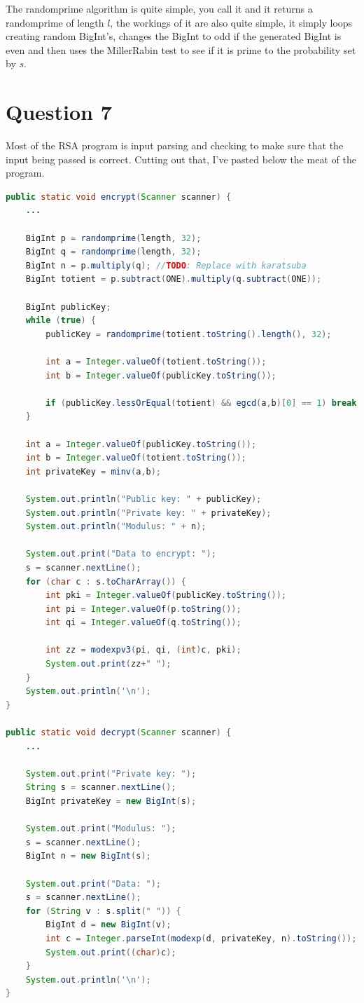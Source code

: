 \documentclass[journal,a4paper]{article}
\begin{document}
The randomprime algorithm is quite simple, you call it and it returns a randomprime of length $l$, the workings of it are also quite simple, it simply loops creating random BigInt's, changes the BigInt to odd if the generated BigInt is even and then uses the MillerRabin test to see if it is prime to the probability set by $s$.

\section*{Question 7}
Most of the RSA program is input parsing and checking to make sure that the input being passed is correct. Cutting out that, I've pasted below the meat of the program.
\begin{lstlisting}[language=Java]
public static void encrypt(Scanner scanner) {
	...
	
	BigInt p = randomprime(length, 32);
	BigInt q = randomprime(length, 32);
	BigInt n = p.multiply(q); //TODO: Replace with karatsuba
	BigInt totient = p.subtract(ONE).multiply(q.subtract(ONE));

	BigInt publicKey;
	while (true) {
		publicKey = randomprime(totient.toString().length(), 32);

		int a = Integer.valueOf(totient.toString());
		int b = Integer.valueOf(publicKey.toString());

		if (publicKey.lessOrEqual(totient) && egcd(a,b)[0] == 1) break;
	}

	int a = Integer.valueOf(publicKey.toString());
	int b = Integer.valueOf(totient.toString());
	int privateKey = minv(a,b);

	System.out.println("Public key: " + publicKey);
	System.out.println("Private key: " + privateKey);
	System.out.println("Modulus: " + n);

	System.out.print("Data to encrypt: ");
	s = scanner.nextLine();
	for (char c : s.toCharArray()) {
		int pki = Integer.valueOf(publicKey.toString());
		int pi = Integer.valueOf(p.toString());
		int qi = Integer.valueOf(q.toString());

		int zz = modexpv3(pi, qi, (int)c, pki);
		System.out.print(zz+" ");
	}
	System.out.println('\n');
}

public static void decrypt(Scanner scanner) {
	...
	
	System.out.print("Private key: ");
	String s = scanner.nextLine();
	BigInt privateKey = new BigInt(s);

	System.out.print("Modulus: ");
	s = scanner.nextLine();
	BigInt n = new BigInt(s);

	System.out.print("Data: ");
	s = scanner.nextLine();
	for (String v : s.split(" ")) {
		BigInt d = new BigInt(v);
		int c = Integer.parseInt(modexp(d, privateKey, n).toString());
		System.out.print((char)c);
	}
	System.out.println('\n');
}
\end{lstlisting}
\end{document}
